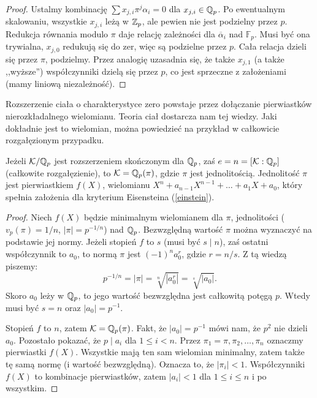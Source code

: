 \begin{proof}
	Ustalmy kombinację $\sum x_{j,i} \pi^j \alpha_i = 0$ dla $x_{j,i} \in \mathbb Q_p$.
	Po ewentualnym skalowaniu, wszystkie $x_{j,i}$ leżą w $\mathbb Z_p$, ale pewien nie jest podzielny przez $p$.
	Redukcja równania modulo $\pi$ daje relację zależności dla $\overline \alpha_i$ nad $\mathbb F_p$.
	Musi być ona trywialna, $x_{j,0}$ redukują się do zer, więc są podzielne przez $p$.
	Cała relacja dzieli się przez $\pi$, podzielmy.
	Przez analogię uzasadnia się, że także $x_{j,1}$ (a także ,,wyższe'') współczynniki dzielą się przez $p$, co jest sprzeczne z założeniami (mamy liniową niezależność).
\end{proof}

Rozszerzenie ciała o charakterystyce zero powstaje przez dołączanie pierwiastków nierozkładalnego wielomianu.
Teoria ciał dostarcza nam tej wiedzy.
Jaki dokładnie jest to wielomian, można powiedzieć na przykład w całkowicie rozgałęzionym przypadku.

\begin{fakt}
	Jeżeli $\mathcal K / \mathbb Q_p$ jest rozszerzeniem skończonym dla $\mathbb Q_p$, zaś $e = n = [\mathcal K : \mathbb Q_p]$ (całkowite rozgałęzienie), to $\mathcal K = \mathbb Q_p(\pi)$, gdzie $\pi$ jest jednolitością.
	Jednolitość $\pi$ jest pierwiastkiem $f(X)$, wielomianu $X^n + a_{n-1} X^{n-1} + \ldots + a_1 X + a_0$, który spełnia założenia dla kryterium Eisensteina (\ref{einstein}).
\end{fakt}

\begin{proof}
	Niech $f(X)$ będzie minimalnym wielomianem dla $\pi$, jednolitości ($v_p(\pi) = 1/n$, $|\pi| = p^{-1/n}$) nad $\mathbb Q_p$.
	Bezwzględną wartość $\pi$ można wyznaczyć na podstawie jej normy.
	Jeżeli stopień $f$ to $s$ (musi być $s \mid n$), zaś ostatni współczynnik to $a_0$, to normą $\pi$ jest $(-1)^n a_0^r$, gdzie $r = n/s$.
	Z tą wiedzą piszemy:
	\[
		p^{-1/n} = |\pi| = \sqrt[n]{|a_0^r|} = \sqrt[s]{|a_0|}.
	\]
	Skoro $a_0$ leży w $\mathbb Q_p$, to jego wartość bezwzględna jest całkowitą potęgą $p$.
	Wtedy musi być $s = n$ oraz $|a_0| = p^{-1}$.

	Stopień $f$ to $n$, zatem $\mathcal K = \mathbb Q_p(\pi)$.
	Fakt, że $|a_0| = p^{-1}$ mówi nam, że $p^2$ nie dzieli $a_0$.
	Pozostało pokazać, że $p \mid a_i$ dla $1 \le i < n$.
	Przez $\pi_1 = \pi, \pi_2, \dots, \pi_n$ oznaczmy pierwiastki $f(X)$.
	Wszystkie mają ten sam wielomian minimalny, zatem także tę samą normę (i wartość bezwzględną).
	Oznacza to, że $|\pi_i| < 1$.
	Współczynniki $f(X)$ to kombinacje pierwiastków, zatem $|a_i| < 1$ dla $1 \le i \le n$ i po wszystkim.
\end{proof}

